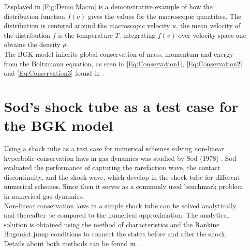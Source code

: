 Displayed in \cref{Fig:Demo Macro} is a demonstrative example of how the distribution function \(f(v)\) gives the values for the macroscopic quantities. The distribution is centered around the macroscopic velocity \(u\), the mean velocity of the distribution \(f\) is the temperature \(T\), integrating \(f(v)\) over velocity space one obtains the density \(\rho\).\\ 

The BGK model inherits global conservation of mass, momentum and energy from the Boltzmann equation, as seen in \cref{Eq:Conservation1}, \cref{Eq:Conservation2} and \cref{Eq:Conservation3} found in \cite{puppo2019kinetic}.
\section{Sod's shock tube as a test case for the BGK model} \label{Sec:FeaturesSOD}
Using a shock tube as a test case for numerical schemes solving non-linear hyperbolic conservation laws in gas dynamics was studied by Sod (1978) \cite{Sod}. Sod evaluated the performance of capturing the rarefaction wave, the contact discontinuity, and the shock wave, which develop in the shock tube for different numerical schemes. Since then it serves as a commonly used benchmark problem in numerical gas dynamics.\\
Non-linear conservation laws in a simple shock tube can be solved analytically and thereafter be compared to the numerical approximation. The analytical solution is obtained using the method of characteristics and the Rankine Hugoniot jump conditions to connect the states before and after the shock. Details about both methods can be found in \cite{CFD1}.\\

